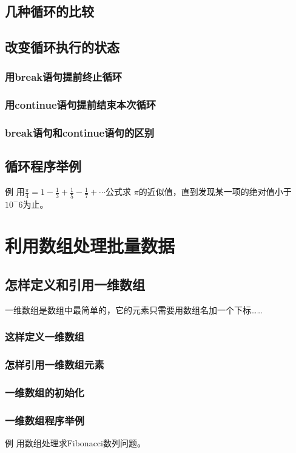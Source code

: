 \section{几种循环的比较}
\section{改变循环执行的状态}
\subsection{用break语句提前终止循环}
\subsection{用continue语句提前结束本次循环}
\subsection{break语句和continue语句的区别}
\section{循环程序举例}
例 用$\frac{\pi}{4} =1 - \frac{1}{3} + \frac{1}{5}- \frac{1}{7} + \cdots$公式求 $\pi$的近似值，直到发现某一项的绝对值小于 $10^-6$为止。


\chapter{利用数组处理批量数据}

\section{怎样定义和引用一维数组}
一维数组是数组中最简单的，它的元素只需要用数组名加一个下标……
\subsection{这样定义一维数组}
\subsection{怎样引用一维数组元素}
\subsection{一维数组的初始化}
\subsection{一维数组程序举例}
例 用数组处理求Fibonacci数列问题。

